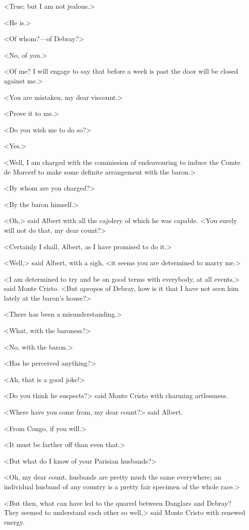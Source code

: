 <True; but I am not jealous.> 

 <He is.> 

 <Of whom?—of Debray?> 

 <No, of you.> 

 <Of me? I will engage to say that before a week is past the door will be closed against me.> 

 <You are mistaken, my dear viscount.> 

 <Prove it to me.> 

 <Do you wish me to do so?> 

 <Yes.> 

 <Well, I am charged with the commission of endeavouring to induce the Comte de Morcerf to make some definite arrangement with the baron.> 

 <By whom are you charged?> 

 <By the baron himself.> 

 <Oh,> said Albert with all the cajolery of which he was capable. <You surely will not do that, my dear count?> 

 <Certainly I shall, Albert, as I have promised to do it.> 

 <Well,> said Albert, with a sigh, <it seems you are determined to marry me.> 

 <I am determined to try and be on good terms with everybody, at all events,> said Monte Cristo. <But apropos of Debray, how is it that I have not seen him lately at the baron's house?> 

 <There has been a misunderstanding.> 

 <What, with the baroness?> 

 <No, with the baron.> 

 <Has he perceived anything?> 

 <Ah, that is a good joke!> 

 <Do you think he suspects?> said Monte Cristo with charming artlessness. 

 <Where have you come from, my dear count?> said Albert. 

 <From Congo, if you will.> 

 <It must be farther off than even that.> 

 <But what do I know of your Parisian husbands?> 

 <Oh, my dear count, husbands are pretty much the same everywhere; an individual husband of any country is a pretty fair specimen of the whole race.> 

 <But then, what can have led to the quarrel between Danglars and Debray? They seemed to understand each other so well,> said Monte Cristo with renewed energy. 

